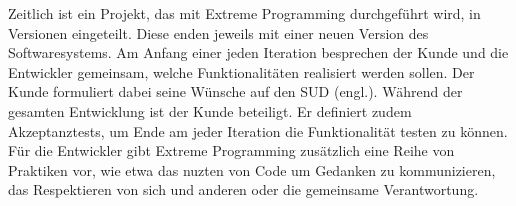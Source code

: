 \begin{parlist}
\begin{enumerate}
	\end{enumerate}
	\item Zeitlich ist ein Projekt, das mit Extreme Programming \cite{enwiki:1150668036} durchgeführt wird,
in Versionen eingeteilt. Diese enden jeweils mit einer neuen Version des Softwaresystems. Am Anfang einer jeden Iteration besprechen der Kunde und die
Entwickler gemeinsam, welche Funktionalitäten realisiert werden sollen. Der Kunde
formuliert dabei seine Wünsche auf den SUD (engl.). Während der gesamten
Entwicklung ist der Kunde beteiligt. Er definiert zudem Akzeptanztests,
um Ende am jeder Iteration die Funktionalität testen zu können. Für die Entwickler gibt Extreme Programming zusätzlich eine Reihe von Praktiken vor, wie etwa
das nuzten von Code um Gedanken zu kommunizieren, das Respektieren von sich und anderen oder die gemeinsame Verantwortung.
\end{parlist}
